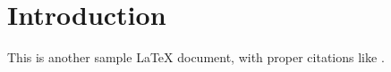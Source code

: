 \section{Introduction}
This is another sample LaTeX document, with proper citations like \cite{smith2021,jones2020,brown2019}.